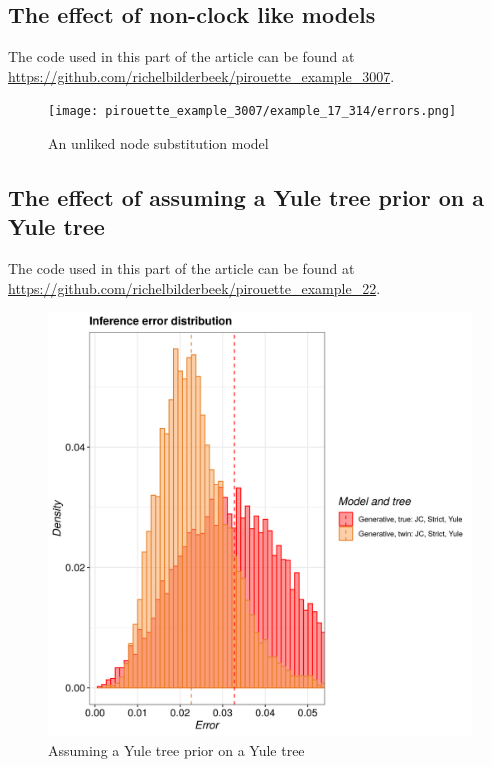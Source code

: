 \subsection{The effect of non-clock like models}

The code used in this part of the article can be found at 
\url{https://github.com/richelbilderbeek/pirouette_example_3007}.

\begin{figure}[H]
  \texttt{[image: pirouette\_example\_3007/example\_17\_314/errors.png]}
  \caption{An unliked node substitution model}
\end{figure}

\subsection{The effect of assuming a Yule tree prior on a Yule tree}

The code used in this part of the article can be found at 
\url{https://github.com/richelbilderbeek/pirouette_example_22}.

\begin{figure}[H]
  \includegraphics[width=\textwidth]{pirouette_example_22/example_22_314/errors.png}
  \caption{Assuming a Yule tree prior on a Yule tree}
\end{figure}

